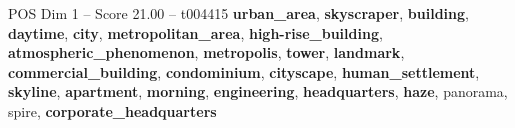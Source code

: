 \begin{textsample}{POS Dim 1 – Score 21.00 – t004415}  \label{ex:f1_pos_012}
\textbf{urban\_area}, \textbf{skyscraper}, \textbf{building}, \textbf{daytime}, \textbf{city}, \textbf{metropolitan\_area}, \textbf{high-rise\_building}, \textbf{atmospheric\_phenomenon}, \textbf{metropolis}, \textbf{tower}, \textbf{landmark}, \textbf{commercial\_building}, \textbf{condominium}, \textbf{cityscape}, \textbf{human\_settlement}, \textbf{skyline}, \textbf{apartment}, \textbf{morning}, \textbf{engineering}, \textbf{headquarters}, \textbf{haze}, panorama, spire, \textbf{corporate\_headquarters}

\end{textsample}
